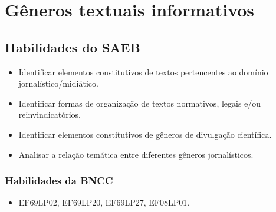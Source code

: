 
\chapter{Gêneros textuais informativos}

\section{Habilidades do SAEB} 

\begin{itemize}
\item Identificar elementos constitutivos de textos pertencentes ao domínio jornalístico/midiático.
\item Identificar formas de organização de textos normativos, legais e/ou reinvindicatórios.
\item Identificar elementos constitutivos de gêneros de divulgação científica.
\item Analisar a relação temática entre diferentes gêneros jornalísticos.
\end{itemize}

\subsection{Habilidades da BNCC}

\begin{itemize}
\tightlist
\item
  EF69LP02, EF69LP20, EF69LP27, EF08LP01.
\end{itemize}

